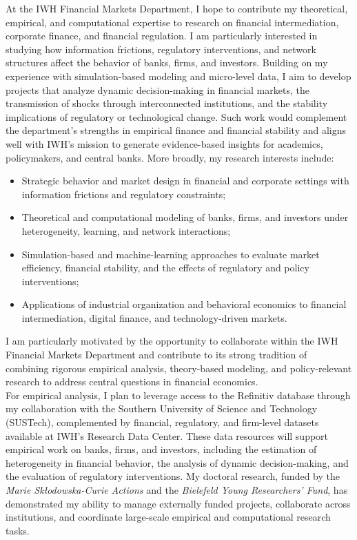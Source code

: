\documentclass{nfr}
\begin{document}
At the IWH Financial Markets Department, I hope to contribute my theoretical, empirical, and computational expertise to research on financial intermediation, corporate finance, and financial regulation. 
I am particularly interested in studying how information frictions, regulatory interventions, and network structures affect the behavior of banks, firms, and investors. 
Building on my experience with simulation-based modeling and micro-level data, I aim to develop projects that analyze dynamic decision-making in financial markets, the transmission of shocks through interconnected institutions, and the stability implications of regulatory or technological change. 
Such work would complement the department’s strengths in empirical finance and financial stability and aligns well with IWH’s mission to generate evidence-based insights for academics, policymakers, and central banks.
More broadly, my research interests include:
\begin{itemize}
    \item Strategic behavior and market design in financial and corporate settings with information frictions and regulatory constraints;
    \item Theoretical and computational modeling of banks, firms, and investors under heterogeneity, learning, and network interactions;
    \item Simulation-based and machine-learning approaches to evaluate market efficiency, financial stability, and the effects of regulatory and policy interventions;
    \item Applications of industrial organization and behavioral economics to financial intermediation, digital finance, and technology-driven markets.
\end{itemize}
I am particularly motivated by the opportunity to collaborate within the IWH Financial Markets Department and contribute to its strong tradition of combining rigorous empirical analysis, theory-based modeling, and policy-relevant research to address central questions in financial economics.\\

For empirical analysis, I plan to leverage access to the Refinitiv database through my collaboration with the Southern University of Science and Technology (SUSTech), complemented by financial, regulatory, and firm-level datasets available at IWH’s Research Data Center. 
These data resources will support empirical work on banks, firms, and investors, including the estimation of heterogeneity in financial behavior, the analysis of dynamic decision-making, and the evaluation of regulatory interventions. 
My doctoral research, funded by the \textit{Marie Skłodowska-Curie Actions} and the \textit{Bielefeld Young Researchers’ Fund}, has demonstrated my ability to manage externally funded projects, collaborate across institutions, and coordinate large-scale empirical and computational research tasks.\\
\end{document}
